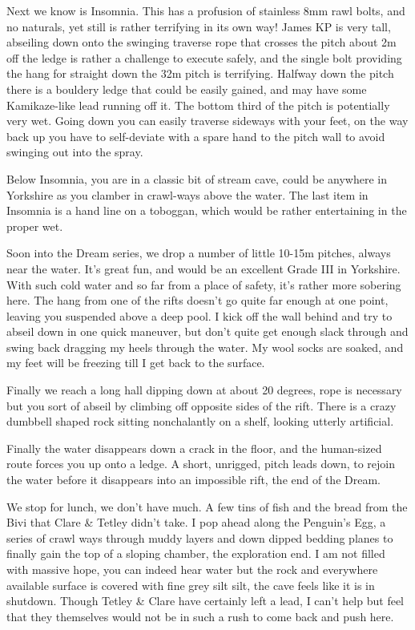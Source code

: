 Next we know is Insomnia. This has a profusion of stainless 8mm rawl
bolts, and no naturals, yet still is rather terrifying in its own way!
James KP is very tall, abseiling down onto the swinging traverse rope
that crosses the pitch about 2m off the ledge is rather a challenge to
execute safely, and the single bolt providing the hang for straight down
the 32m pitch is terrifying. Halfway down the pitch there is a bouldery
ledge that could be easily gained, and may have some Kamikaze-like lead
running off it. The bottom third of the pitch is potentially very wet.
Going down you can easily traverse sideways with your feet, on the way
back up you have to self-deviate with a spare hand to the pitch wall to
avoid swinging out into the spray.

Below Insomnia, you are in a classic bit of stream cave, could be
anywhere in Yorkshire as you clamber in crawl-ways above the water. The
last item in Insomnia is a hand line on a toboggan, which would be
rather entertaining in the proper wet.

Soon into the Dream series, we drop a number of little 10-15m pitches,
always near the water. It's great fun, and would be an excellent Grade
III in Yorkshire. With such cold water and so far from a place of
safety, it's rather more sobering here. The hang from one of the rifts
doesn't go quite far enough at one point, leaving you suspended above a
deep pool. I kick off the wall behind and try to abseil down in one
quick maneuver, but don't quite get enough slack through and swing back
dragging my heels through the water. My wool socks are soaked, and my
feet will be freezing till I get back to the surface.

Finally we reach a long hall dipping down at about 20 degrees, rope is
necessary but you sort of abseil by climbing off opposite sides of the
rift. There is a crazy dumbbell shaped rock sitting nonchalantly on a
shelf, looking utterly artificial.

Finally the water disappears down a crack in the floor, and the
human-sized route forces you up onto a ledge. A short, unrigged, pitch
leads down, to rejoin the water before it disappears into an impossible
rift, the end of the Dream.

We stop for lunch, we don't have much. A few tins of fish and the bread
from the Bivi that Clare \& Tetley didn't take. I pop ahead along the
Penguin's Egg, a series of crawl ways through muddy layers and down
dipped bedding planes to finally gain the top of a sloping chamber, the
exploration end. I am not filled with massive hope, you can indeed hear
water but the rock and everywhere available surface is covered with fine
grey silt silt, the cave feels like it is in shutdown. Though Tetley \&
Clare have certainly left a lead, I can't help but feel that they
themselves would not be in such a rush to come back and push here.

